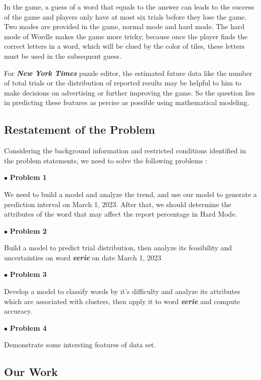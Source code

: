 \documentclass[12pt]{article}
\begin{document}
In the game, a guess of a word that equals to the answer can leads to the success of the game and players only have at most six trials before they lose the game. Two modes are provided in the game, normal mode and hard mode. The hard mode of Wordle makes the game more tricky, because once the player finds the correct letters in a word, which will be clued by the color of tiles, these letters must be used in the subsequent guess.

For \textbf{\textit{New York Times}} puzzle editor, the estimated future data like the number of total trials or the distribution of reported results may be helpful to him to make decisions on advertising or further improving the game. So the question lies in predicting these features as percise as possible using mathematical modeling.

\subsection{Restatement of the Problem}
Considering the background information and restricted conditions identified in the problem statements, we need to solve the following problems :

$\bullet$ \textbf{Problem 1} 

We need to build a model and analyze the trend, and use our model to generate a prediction interval on March 1, 2023. After that, we should determine the attributes of the word that may affect the report percentage in Hard Mode.

$\bullet$ \textbf{Problem 2} 

Build a model to predict trial distribution, then analyze its feasibility and uncertainties on word \textbf{\textit{eerie}} on date March 1, 2023

$\bullet$ \textbf{Problem 3} 

Develop a model to classify words by it's difficulty and analyze its attributes which are associated with clusters, then apply it to word \textbf{\textit{eerie}} and compute accuracy.

$\bullet$ \textbf{Problem 4} 

Demonstrate some intersting features of data set.

\newpage
\subsection{Our Work}
\end{document}
